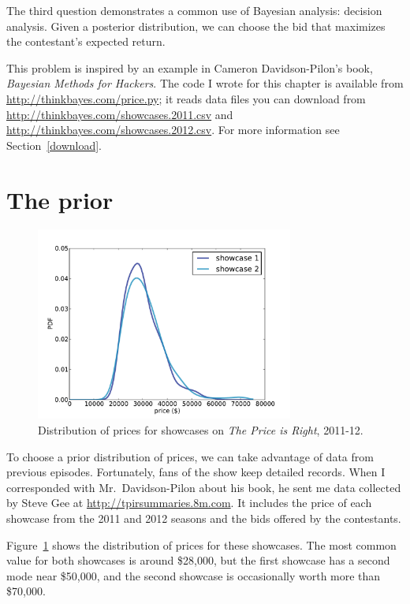\documentclass[12pt]{book}
\begin{document}
The third question demonstrates a common use of Bayesian analysis:
decision analysis.  Given a posterior distribution, we can choose
the bid that maximizes the contestant's expected return.

This problem is inspired by an example in Cameron Davidson-Pilon's
book, {\it Bayesian Methods for Hackers}.  The code I wrote for this
chapter is available from \url{http://thinkbayes.com/price.py}; it
reads data files you can download from
\url{http://thinkbayes.com/showcases.2011.csv} and
\url{http://thinkbayes.com/showcases.2012.csv}.    For more information
see Section~\ref{download}.


\section{The prior}

\begin{figure}
\centerline{\includegraphics[height=2.5in]{figs/price1.pdf}}
\caption{Distribution of prices for showcases on
{\it The Price is Right}, 2011-12.}
\label{fig.price1}
\end{figure}

To choose a prior distribution of prices, we can take advantage
of data from previous episodes.  Fortunately, fans of the show
keep detailed records.  When I corresponded with Mr.~Davidson-Pilon
about his book, he sent me data collected by Steve Gee at
\url{http://tpirsummaries.8m.com}.  It includes the price of
each showcase from the 2011 and 2012 seasons and the bids
offered by the contestants.

Figure~\ref{fig.price1} shows the distribution of prices for these
showcases.  The most common value for both showcases is around
\$28,000, but the first showcase has a second mode near \$50,000,
and the second showcase is occasionally worth more than \$70,000.
\end{document}
